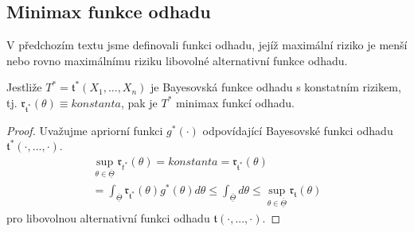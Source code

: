 \subsection{Minimax funkce odhadu}

V předchozím textu jsme definovali funkci odhadu, jejíž maximální riziko je menší nebo rovno maximálnímu riziku libovolné alternativní funkce odhadu.

\begin{theorem}
Jestliže $T^* = \mathfrak{t}^*(X_1, ..., X_n)$ je Bayesovská funkce odhadu s konstatním rizikem, tj. $\mathfrak{r}_{\mathfrak{t}^*}(\theta) \equiv \textit{konstanta}$, pak je $T^*$ minimax funkcí odhadu.
\end{theorem}

\begin{proof}
Uvažujme apriorní funkci $g^*(\cdot)$ odpovídající Bayesovské funkci odhadu $\mathfrak{t}^*(\cdot, ..., \cdot)$.
\begin{gather*}
\sup_{\theta \in \overline{\underline{\Theta}}} \mathfrak{r}_{\mathit{t^*}}(\theta) = \textit{konstanta} = \mathfrak{r}_{\mathfrak{t}^*}(\theta)\\
= \int_{\overline{\underline{\Theta}}} \mathfrak{r}_{\mathfrak{t}^*}(\theta)g^*(\theta)d \theta \le \int_{\overline{\underline{\Theta}}} d \theta \le \sup_{\theta \in \overline{\underline{\Theta}}}\mathfrak{r}_{\mathfrak{t}}(\theta)
\end{gather*}
pro libovolnou alternativní funkci odhadu $\mathfrak{t}(\cdot, ..., \cdot)$.
\end{proof}

